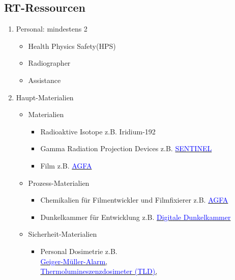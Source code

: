 \subsection{RT-Ressourcen}
\label{sec:resourcen}
\begin{enumerate}
\item Personal: mindestens 2
\begin{itemize}
\item Health Physics Safety(HPS)
\item Radiographer
\item Assistance
\end{itemize}
\item Haupt-Materialien 
\begin{itemize}
\item Materialien
\begin{itemize}
\item Radioaktive Isotope z.B. Iridium-192
\item Gamma Radiation Projection Devices z.B.
\href{https://www.ndt.com.au/product/qsa-sentinel-iridium-ir-192-sources-for-gamma-radiography/}{\textcolor{blue}{SENTINEL}}
\item Film z.B.
\href{https://www.gemeasurement.com/sites/gemc.dev/files/geit-40007-structurix_en_04-17.pdf}{\textcolor{blue}{AGFA}} 
\end{itemize}
\item Prozess-Materialien
\begin{itemize}
\item Chemikalien für Filmentwickler und Filmfixierer z.B. \href{https://www.gemeasurement.com/sites/gemc.dev/files/geit-40007-structurix_en_04-17.pdf}{\textcolor{blue}{AGFA}}
\item Dunkelkammer für Entwicklung z.B.
\href{https://www.gemeasurement.com/sites/gemc.dev/files/structurix_processing_equipment_brochure_english.pdf}{\textcolor{blue}{Digitale Dunkelkammer}}
\end{itemize}
\item Sicherheit-Materialien
\begin{itemize}
\item Personal Dosimetrie z.B.\\
\href{https://www.pce-instruments.com/deutsch/messtechnik/messgeraete-fuer-alle-parameter/geigerzaehler-kat_10582_1.htm}{\textcolor{blue}{Geiger-Müller-Alarm},}\\
\href{https://de.wikipedia.org/wiki/Thermolumineszenzdosimeter}{\textcolor{blue}{Thermolumineszenzdosimeter (TLD)},}\\

\end{itemize}
\end{itemize}
\end{enumerate}
